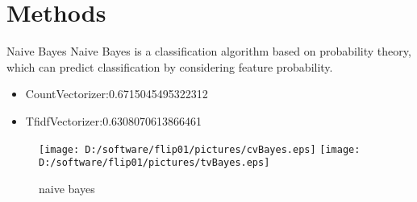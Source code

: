 \documentclass[
 size=12pt,
 paper=smartboard, %
 mode=present, %
 display=slides, %
style=tuliplab,
pauseslide,
fleqn,leqno]{powerdot}
\begin{document}
\section{Methods}
\begin{slide}[toc=,bm=]{Naive Bayes}
  \hspace{0.5cm}  Naive Bayes is a classification algorithm based on probability theory, which can predict classification by considering feature probability. 
  \begin{itemize}
    \item CountVectorizer:0.6715045495322312 \ 

    \item TfidfVectorizer:0.6308070613866461
    \end{itemize}
 
     
     \begin{figure}[ht]%
      \centering%
      \texttt{[image: D:/software/flip01/pictures/cvBayes.eps]}
      \texttt{[image: D:/software/flip01/pictures/tvBayes.eps]}
      \caption{naive bayes}%
      \end{figure} 
    \end{slide}
\end{document}

